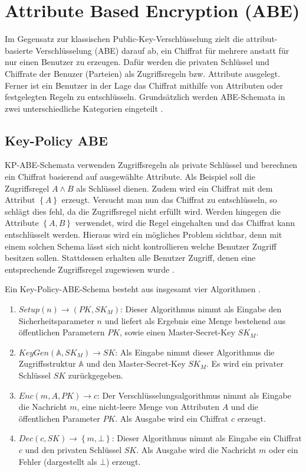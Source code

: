 \section{Attribute Based Encryption (ABE)}
Im Gegensatz zur klassischen Public-Key-Verschlüsselung zielt die
attribut-basierte Verschlüsselung (ABE) darauf ab, ein Chiffrat für mehrere anstatt
für nur einen Benutzer zu erzeugen. Dafür werden die privaten Schlüssel und
Chiffrate der Benuzer (Parteien) als Zugriffsregeln bzw. Attribute ausgelegt.
Ferner ist ein Benutzer in der Lage das Chiffrat mithilfe von Attributen oder
festgelegten Regeln zu entschlüsseln. Grundsätzlich werden ABE-Schemata in
zwei unterschiedliche Kategorien eingeteilt \cite{phoabe}.


\subsection{Key-Policy ABE}
KP-ABE-Schemata verwenden Zugriffsregeln als private Schlüs\-sel und berechnen
ein Chiffrat basierend auf ausgewählte Attribute. Als Beispiel soll die
Zugriffsregel $A \land B$ als Schlüssel dienen. Zudem wird ein Chiffrat mit
dem Attribut $\left\{A\right\}$ erzeugt. Versucht man nun das Chiffrat zu entschlüsseln,
so schlägt dies fehl, da die Zugriffsregel nicht erfüllt wird. Werden hingegen
die Attribute $\left\{A, B\right\}$ verwendet, wird die Regel eingehalten und
das Chiffrat kann entschlüsselt werden. Hieraus wird ein mögliches Problem
sichtbar, denn mit einem solchen Schema lässt sich nicht kontrollieren welche
Benutzer Zugriff besitzen sollen. Stattdessen erhalten alle Benutzer Zugriff,
denen eine entsprechende Zugriffsregel zugewiesen wurde \cite{cp-abe-ieee}.

Ein Key-Policy-ABE-Schema besteht aus insgesamt vier Algorithmen \cite{kp-abe}.

\begin{enumerate}
	\item $\textit{Setup}\left(n\right) \to \left(PK, SK_M\right)$: Dieser
		Algorithmus nimmt als Eingabe den Sicherheitsparameter $n$ und liefert als
		Ergebnis eine Menge bestehend aus öffentlichen Parametern $PK$, sowie
		einen Master-Secret-Key $SK_M$.
	\item $\textit{KeyGen}\left(\mathbb{A}, SK_M\right) \to SK$: Als Eingabe
		nimmt dieser Algorithmus die Zu\-griffs\-struktur $\mathbb{A}$ und den
		Master-Secret-Key $SK_M$. Es wird ein privater Schlüssel $SK$
		zurückgegeben.
	\item $Enc\left(m, A, PK\right) \to c$: Der Verschlüsselungsalgorithmus
		nimmt als Eingabe die Nachricht $m$, eine nicht-leere Menge von Attributen
		$A$ und die öffentlichen Parameter $PK$. Als Ausgabe wird ein Chiffrat $c$
		erzeugt.
	\item $Dec\left(c, SK\right) \to \left\{m, \bot\right\}$: Dieser Algorithmus
		nimmt als Eingabe ein Chiffrat $c$ und den privaten Schlüssel $SK$. Als
		Ausgabe wird die Nachricht $m$ oder ein Fehler (dargestellt als $\bot$)
		erzeugt.
\end{enumerate}

